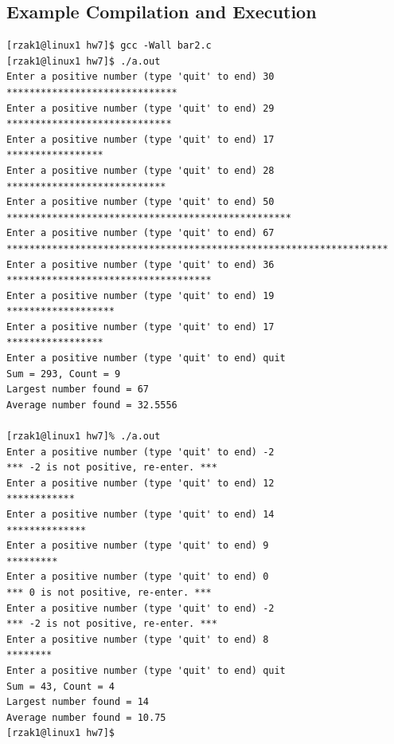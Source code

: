 \documentclass[letter,11pt]{article}
\begin{document}
\subsection*{Example Compilation and Execution}
\begin{verbatim}
[rzak1@linux1 hw7]$ gcc -Wall bar2.c
[rzak1@linux1 hw7]$ ./a.out
Enter a positive number (type 'quit' to end) 30
******************************
Enter a positive number (type 'quit' to end) 29
*****************************
Enter a positive number (type 'quit' to end) 17
*****************
Enter a positive number (type 'quit' to end) 28
****************************
Enter a positive number (type 'quit' to end) 50
**************************************************
Enter a positive number (type 'quit' to end) 67
*******************************************************************
Enter a positive number (type 'quit' to end) 36
************************************
Enter a positive number (type 'quit' to end) 19
*******************
Enter a positive number (type 'quit' to end) 17
*****************
Enter a positive number (type 'quit' to end) quit
Sum = 293, Count = 9
Largest number found = 67
Average number found = 32.5556

[rzak1@linux1 hw7]% ./a.out
Enter a positive number (type 'quit' to end) -2
*** -2 is not positive, re-enter. ***
Enter a positive number (type 'quit' to end) 12
************
Enter a positive number (type 'quit' to end) 14
**************
Enter a positive number (type 'quit' to end) 9
*********
Enter a positive number (type 'quit' to end) 0
*** 0 is not positive, re-enter. ***
Enter a positive number (type 'quit' to end) -2
*** -2 is not positive, re-enter. ***
Enter a positive number (type 'quit' to end) 8
********
Enter a positive number (type 'quit' to end) quit
Sum = 43, Count = 4
Largest number found = 14
Average number found = 10.75
[rzak1@linux1 hw7]$ 
\end{verbatim}
\end{document}
